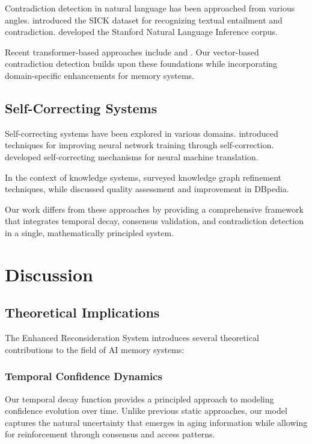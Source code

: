 \documentclass[12pt,a4paper]{article}
\begin{document}
Contradiction detection in natural language has been approached from various angles. \cite{marelli2014sick} introduced the SICK dataset for recognizing textual entailment and contradiction. \cite{bowman2015large} developed the Stanford Natural Language Inference corpus.

Recent transformer-based approaches include \cite{liu2019roberta} and \cite{rogers2020primer}. Our vector-based contradiction detection builds upon these foundations while incorporating domain-specific enhancements for memory systems.

\subsection{Self-Correcting Systems}

Self-correcting systems have been explored in various domains. \cite{hinton2012improving} introduced techniques for improving neural network training through self-correction. \cite{liang2017neural} developed self-correcting mechanisms for neural machine translation.

In the context of knowledge systems, \cite{paulheim2017knowledge} surveyed knowledge graph refinement techniques, while \cite{lehmann2015dbpedia} discussed quality assessment and improvement in DBpedia.

Our work differs from these approaches by providing a comprehensive framework that integrates temporal decay, consensus validation, and contradiction detection in a single, mathematically principled system.

\section{Discussion}

\subsection{Theoretical Implications}

The Enhanced Reconsideration System introduces several theoretical contributions to the field of AI memory systems:

\subsubsection{Temporal Confidence Dynamics}

Our temporal decay function provides a principled approach to modeling confidence evolution over time. Unlike previous static approaches, our model captures the natural uncertainty that emerges in aging information while allowing for reinforcement through consensus and access patterns.
\end{document}
